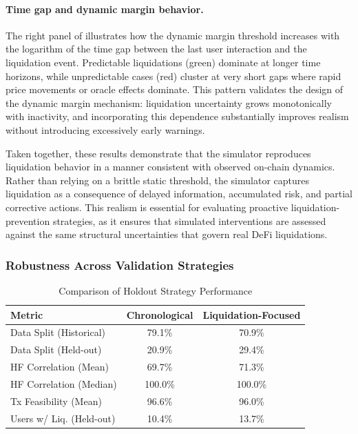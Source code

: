 \documentclass[manuscript,screen,review]{acmart}
\begin{document}
\paragraph{Time gap and dynamic margin behavior.}
The right panel of  illustrates how the dynamic margin threshold increases with the logarithm of the time gap between the last user interaction and the liquidation event. Predictable liquidations (green) dominate at longer time horizons, while unpredictable cases (red) cluster at very short gaps where rapid price movements or oracle effects dominate. This pattern validates the design of the dynamic margin mechanism: liquidation uncertainty grows monotonically with inactivity, and incorporating this dependence substantially improves realism without introducing excessively early warnings.

Taken together, these results demonstrate that the simulator reproduces liquidation behavior in a manner consistent with observed on-chain dynamics. Rather than relying on a brittle static threshold, the simulator captures liquidation as a consequence of delayed information, accumulated risk, and partial corrective actions. This realism is essential for evaluating proactive liquidation-prevention strategies, as it ensures that simulated interventions are assessed against the same structural uncertainties that govern real DeFi liquidations.

\subsubsection{Robustness Across Validation Strategies}
\label{sec:robustness}


\begin{table}[h]
\centering
\caption{Comparison of Holdout Strategy Performance}
\label{tab:split_strategies}
\begin{tabular}{l S[table-format=3.1] S[table-format=3.1]} 
\hline
\textbf{Metric} & \textbf{Chronological} & \textbf{Liquidation-Focused} \\ \hline
Data Split (Historical) & 79.1\% & 70.9\% \\
Data Split (Held-out) & 20.9\% & 29.4\% \\
HF Correlation (Mean) & 69.7\% & 71.3\% \\
HF Correlation (Median) & 100.0\% & 100.0\% \\ %
Tx Feasibility (Mean) & 96.6\% & 96.0\% \\
Users w/ Liq. (Held-out) & 10.4\% & 13.7\% \\ \hline
\end{tabular}
\end{table}
\end{document}
